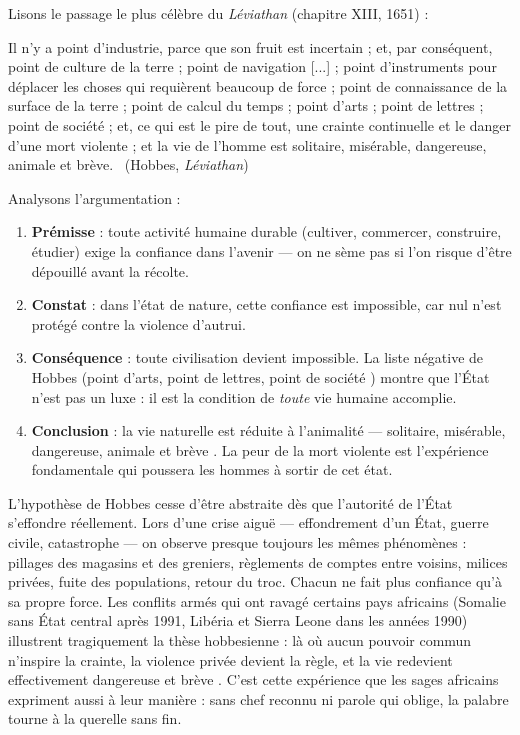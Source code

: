 \documentclass[11pt]{article}
\begin{document}
\begin{experience}
Lisons le passage le plus célèbre du \emph{Léviathan} (chapitre XIII, 1651) :

\guillemotleft Il n'y a point d'industrie, parce que son fruit est incertain ; et, par conséquent, point de culture de la terre ; point de navigation [...] ; point d'instruments pour déplacer les choses qui requièrent beaucoup de force ; point de connaissance de la surface de la terre ; point de calcul du temps ; point d'arts ; point de lettres ; point de société ; et, ce qui est le pire de tout, une crainte continuelle et le danger d'une mort violente ; et la vie de l'homme est solitaire, misérable, dangereuse, animale et brève. \guillemotright\ (Hobbes, \emph{Léviathan})

Analysons l'argumentation :
\begin{enumerate}
\item \textbf{Prémisse} : toute activité humaine durable (cultiver, commercer, construire, étudier) exige la confiance dans l'avenir — on ne sème pas si l'on risque d'être dépouillé avant la récolte.
\item \textbf{Constat} : dans l'état de nature, cette confiance est impossible, car nul n'est protégé contre la violence d'autrui.
\item \textbf{Conséquence} : toute civilisation devient impossible. La liste négative de Hobbes (\guillemotleft point d'arts, point de lettres, point de société \guillemotright) montre que l'État n'est pas un luxe : il est la condition de \emph{toute} vie humaine accomplie.
\item \textbf{Conclusion} : la vie naturelle est réduite à l'animalité — \guillemotleft solitaire, misérable, dangereuse, animale et brève \guillemotright. La peur de la mort violente est l'expérience fondamentale qui poussera les hommes à sortir de cet état.
\end{enumerate}
\end{experience}

\begin{exemplebox}
L'hypothèse de Hobbes cesse d'être abstraite dès que l'autorité de l'État s'effondre réellement. Lors d'une crise aiguë — effondrement d'un État, guerre civile, catastrophe — on observe presque toujours les mêmes phénomènes : pillages des magasins et des greniers, règlements de comptes entre voisins, milices privées, fuite des populations, retour du troc. Chacun ne fait plus confiance qu'à sa propre force. Les conflits armés qui ont ravagé certains pays africains (Somalie sans État central après 1991, Libéria et Sierra Leone dans les années 1990) illustrent tragiquement la thèse hobbesienne : là où aucun \guillemotleft pouvoir commun \guillemotright n'inspire la crainte, la violence privée devient la règle, et la vie redevient effectivement \guillemotleft dangereuse et brève \guillemotright. C'est cette expérience que les sages africains expriment aussi à leur manière : sans chef reconnu ni parole qui oblige, la palabre tourne à la querelle sans fin.
\end{exemplebox}
\end{document}
